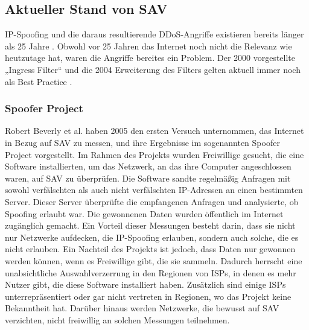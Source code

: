 \documentclass[sigplan,screen]{acmart}
\begin{document}
\subsection{Aktueller Stand von SAV}
IP-Spoofing und die daraus resultierende DDoS-Angriffe existieren bereits länger als 25 Jahre \cite{manrs01}. Obwohl vor 25 Jahren das Internet noch nicht die Relevanz wie heutzutage hat, waren die Angriffe bereites ein Problem. Der 2000 vorgestellte „Ingress Filter“ \cite{Ingress01} und die 2004 Erweiterung des Filters \cite{Bcp84} gelten aktuell immer noch als Best Practice \cite{CRP01} \cite{Lone01} \cite{Hal01} \cite{manrs01}.  

\subsubsection{Spoofer Project}
Robert Beverly et al. \cite{Spoofer01} haben 2005 den ersten Versuch unternommen, das Internet in Bezug auf SAV zu messen, und ihre Ergebnisse im sogenannten Spoofer Project vorgestellt. Im Rahmen des Projekts wurden Freiwillige gesucht, die eine Software installierten, um das Netzwerk, an das ihre Computer angeschlossen waren, auf SAV zu überprüfen. Die Software sandte regelmäßig Anfragen mit sowohl verfälschten als auch nicht verfälschten IP-Adressen an einen bestimmten Server. Dieser Server überprüfte die empfangenen Anfragen und analysierte, ob Spoofing erlaubt war. Die gewonnenen Daten wurden öffentlich im Internet zugänglich gemacht. Ein Vorteil dieser Messungen besteht darin, dass sie nicht nur Netzwerke aufdecken, die IP-Spoofing erlauben, sondern auch solche, die es nicht erlauben. Ein Nachteil des Projekts ist jedoch, dass Daten nur gewonnen werden können, wenn es Freiwillige gibt, die sie sammeln. Dadurch herrscht eine unabsichtliche Auswahlverzerrung in den Regionen von ISPs, in denen es mehr Nutzer gibt, die diese Software installiert haben. Zusätzlich sind einige ISPs unterrepräsentiert oder gar nicht vertreten in Regionen, wo das Projekt keine Bekanntheit hat. Darüber hinaus werden Netzwerke, die bewusst auf SAV verzichten, nicht freiwillig an solchen Messungen teilnehmen.
\end{document}
